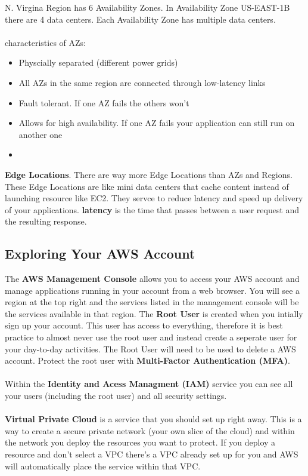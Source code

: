 \documentclass{article}%
\begin{document}
N. Virgina Region has 6 Availability Zones. In Availability Zone US-EAST-1B there are 4 data centers. Each Availability Zone has multiple data centers. \\ \\
characteristics of AZs:
\begin{itemize}
    \item Physcially separated (different power grids)
    \item All AZs in the same region are connected through low-latency links 
    \item Fault tolerant. If one AZ fails the others won't
    \item Allows for high availability. If one AZ fails your application can still run on another one
    \item 
\end{itemize}

\textbf{Edge Locations}. There are way more Edge Locations than AZs and Regions. These Edge Locations are like mini data centers that cache content instead of launching resource like EC2. They servce to reduce latency and speed up delivery of your applications. \textbf{latency} is the time that 
passes between a user request and the resulting response.  

\subsection{Exploring Your AWS Account}
The \textbf{AWS Management Console} allows you to access your AWS account and manage applications running in your account from a web browser. You will see a region at the top right and the services listed in the management console will be the services available in that region. The \textbf{Root User} is created when you intially sign up your account. This user has access to everything, therefore it is best practice to almost never use the root user and instead create a 
seperate user for your day-to-day activities. The Root User will need to be used to delete a AWS account. Protect the root user with \textbf{Multi-Factor Authentication (MFA)}. \\ \\

Within the \textbf{Identity and Acess Managment (IAM)} service you can see all your users (including the root user) and all security settings. \\ \\ 

\textbf{Virtual Private Cloud} is a service that you should set up right away. This is a way to create a secure private network (your own slice of the cloud) and within the network you deploy the resources you want to protect. If you deploy a resource and don't select a VPC there's a VPC already set up for you and AWS will automatically place the service within that VPC. \\ \\ 
\end{document}
